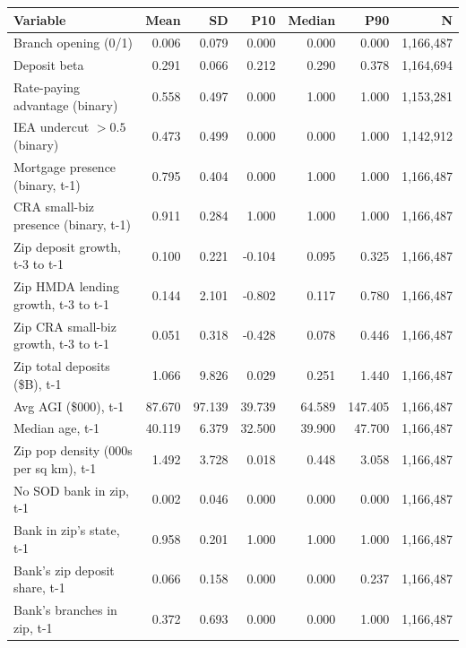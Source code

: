 \begin{tabular}{lrrrrrr}
\toprule
Variable & Mean & SD & P10 & Median & P90 & N \\
\midrule
Branch opening (0/1) & 0.006 & 0.079 & 0.000 & 0.000 & 0.000 & 1,166,487 \\
Deposit beta & 0.291 & 0.066 & 0.212 & 0.290 & 0.378 & 1,164,694 \\
Rate-paying advantage (binary) & 0.558 & 0.497 & 0.000 & 1.000 & 1.000 & 1,153,281 \\
IEA undercut $> 0.5$ (binary) & 0.473 & 0.499 & 0.000 & 0.000 & 1.000 & 1,142,912 \\
Mortgage presence (binary, t-1) & 0.795 & 0.404 & 0.000 & 1.000 & 1.000 & 1,166,487 \\
CRA small-biz presence (binary, t-1) & 0.911 & 0.284 & 1.000 & 1.000 & 1.000 & 1,166,487 \\
Zip deposit growth, t-3 to t-1 & 0.100 & 0.221 & -0.104 & 0.095 & 0.325 & 1,166,487 \\
Zip HMDA lending growth, t-3 to t-1 & 0.144 & 2.101 & -0.802 & 0.117 & 0.780 & 1,166,487 \\
Zip CRA small-biz growth, t-3 to t-1 & 0.051 & 0.318 & -0.428 & 0.078 & 0.446 & 1,166,487 \\
Zip total deposits (\$B), t-1 & 1.066 & 9.826 & 0.029 & 0.251 & 1.440 & 1,166,487 \\
Avg AGI (\$000), t-1 & 87.670 & 97.139 & 39.739 & 64.589 & 147.405 & 1,166,487 \\
Median age, t-1 & 40.119 & 6.379 & 32.500 & 39.900 & 47.700 & 1,166,487 \\
Zip pop density (000s per sq km), t-1 & 1.492 & 3.728 & 0.018 & 0.448 & 3.058 & 1,166,487 \\
No SOD bank in zip, t-1 & 0.002 & 0.046 & 0.000 & 0.000 & 0.000 & 1,166,487 \\
Bank in zip's state, t-1 & 0.958 & 0.201 & 1.000 & 1.000 & 1.000 & 1,166,487 \\
Bank's zip deposit share, t-1 & 0.066 & 0.158 & 0.000 & 0.000 & 0.237 & 1,166,487 \\
Bank's branches in zip, t-1 & 0.372 & 0.693 & 0.000 & 0.000 & 1.000 & 1,166,487 \\
\bottomrule
\end{tabular}

